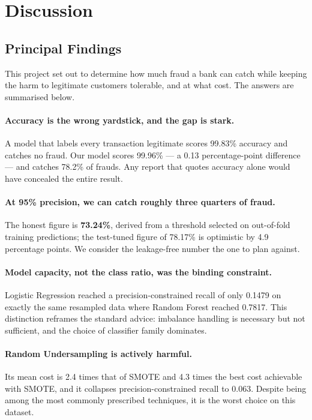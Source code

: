 \section{Discussion}
\label{sec:discussion}

\subsection{Principal Findings}

This project set out to determine how much fraud a bank can catch while keeping
the harm to legitimate customers tolerable, and at what cost. The answers are
summarised below.

\paragraph*{Accuracy is the wrong yardstick, and the gap is stark.} A model that
labels every transaction legitimate scores 99.83\% accuracy and catches no
fraud. Our model scores 99.96\% --- a 0.13 percentage-point difference --- and
catches 78.2\% of frauds. Any report that quotes accuracy alone would have
concealed the entire result.

\paragraph*{At 95\% precision, we can catch roughly three quarters of fraud.} The
honest figure is \textbf{73.24\%}, derived from a threshold selected on
out-of-fold training predictions; the test-tuned figure of 78.17\% is
optimistic by 4.9 percentage points. We consider the leakage-free number the
one to plan against.

\paragraph*{Model capacity, not the class ratio, was the binding constraint.}
Logistic Regression reached a precision-constrained recall of only 0.1479 on
exactly the same resampled data where Random Forest reached 0.7817. This
distinction reframes the standard advice: imbalance handling is necessary but
not sufficient, and the choice of classifier family dominates.

\paragraph*{Random Undersampling is actively harmful.} Its mean cost is 2.4
times that of SMOTE and 4.3 times the best cost achievable with SMOTE, and it
collapses precision-constrained recall to 0.063. Despite being among the most
commonly prescribed techniques, it is the worst choice on this dataset.

